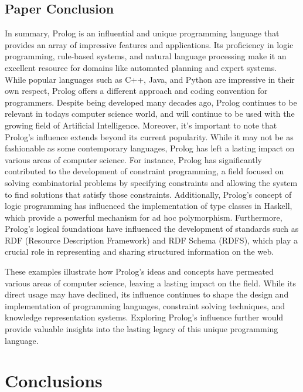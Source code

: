 \documentclass{article}
\theoremstyle{theorem}
\theoremstyle{definition}
\theoremstyle{remark}
\begin{document}
\subsection{Paper Conclusion}
In summary, Prolog is an influential and unique programming language that provides an array of impressive features and applications. Its proficiency in logic programming, rule-based systems, and natural language processing make it an excellent resource for domains like automated planning and expert systems. While popular languages such as C++, Java, and Python are impressive in their own respect, Prolog offers a different approach and coding convention for programmers. Despite being developed many decades ago, Prolog continues to be relevant in todays computer science world, and will continue to be used with the growing field of Artificial Intelligence. Moreover, it's important to note that Prolog's influence extends beyond its current popularity. While it may not be as fashionable as some contemporary languages, Prolog has left a lasting impact on various areas of computer science. For instance, Prolog has significantly contributed to the development of constraint programming, a field focused on solving combinatorial problems by specifying constraints and allowing the system to find solutions that satisfy those constraints. Additionally, Prolog's concept of logic programming has influenced the implementation of type classes in Haskell, which provide a powerful mechanism for ad hoc polymorphism. Furthermore, Prolog's logical foundations have influenced the development of standards such as RDF (Resource Description Framework) and RDF Schema (RDFS), which play a crucial role in representing and sharing structured information on the web.

\noindent\newline These examples illustrate how Prolog's ideas and concepts have permeated various areas of computer science, leaving a lasting impact on the field. While its direct usage may have declined, its influence continues to shape the design and implementation of programming languages, constraint solving techniques, and knowledge representation systems. Exploring Prolog's influence further would provide valuable insights into the lasting legacy of this unique programming language.


\section{Conclusions}\label{conclusions}
\end{document}
